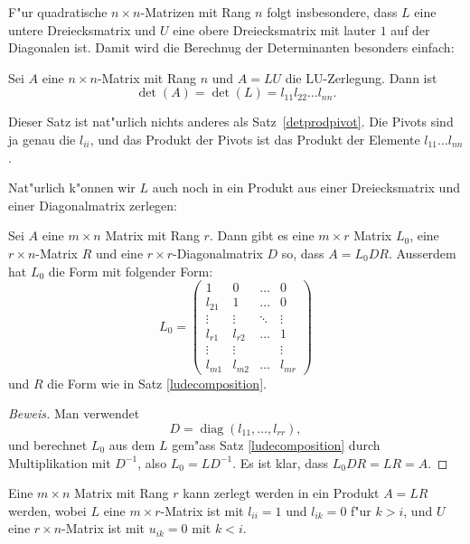F"ur quadratische $n\times n$-Matrizen mit Rang $n$ folgt insbesondere,
dass $L$ eine untere Dreiecksmatrix und $U$ eine obere Dreiecksmatrix
mit lauter $1$ auf der Diagonalen ist.
Damit wird die Berechnug der
Determinanten besonders einfach:

\begin{satz}
Sei $A$ eine $n\times n$-Matrix mit Rang $n$ und $A=LU$ die LU-Zerlegung.
Dann ist
\[
\det(A)=\det(L)=l_{11}l_{22}\dots l_{nn}.
\]
\end{satz}

Dieser Satz ist nat"urlich nichts anderes als Satz~\ref{detprodpivot}.
Die Pivots sind ja genau die $l_{ii}$, und 
das Produkt der Pivots ist das Produkt der Elemente
$l_{11}\dots l_{nn}$.

Nat"urlich k"onnen wir $L$ auch noch in ein Produkt aus einer
Dreiecksmatrix und einer Diagonalmatrix zerlegen:

\begin{satz}
\label{ldrdecomposition}
Sei $A$ eine $m\times n$ Matrix mit Rang $r$.
Dann gibt es eine $m\times r$ Matrix $L_0$, eine $r\times n$-Matrix $R$
und eine $r\times r$-Diagonalmatrix $D$
so, dass $A=L_0DR$.
Ausserdem hat $L_0$ die Form mit folgender Form:
\[
L_0=\begin{pmatrix}
1     &0&\dots&0\\
l_{21}&1     &\dots&0\\
\vdots&\vdots&\ddots&\vdots\\
l_{r1}&l_{r2}&\dots&1     \\
\vdots&\vdots& &\vdots\\
l_{m1}&l_{m2}&\dots&l_{mr}
\end{pmatrix}
\]
und $R$ die Form wie in Satz \ref{ludecomposition}.
\end{satz}

\begin{proof}[Beweis]
Man verwendet 
\[
D=\operatorname{diag}(l_{11},\dots,l_{rr}),
\]
und berechnet $L_0$ aus dem $L$ gem"ass Satz \ref{ludecomposition} durch
Multiplikation mit $D^{-1}$, also $L_0=LD^{-1}$.
Es ist klar, dass
$L_0DR=LR=A$.
\end{proof}

\begin{satz}[LR-Zerlegung]
Eine $m\times n$ Matrix mit Rang $r$ kann zerlegt werden in ein Produkt $A=LR$
werden, wobei $L$ eine $m\times r$-Matrix ist mit $l_{ii}=1$ und $l_{ik}=0$
f"ur $k>i$, und $U$ eine $r\times n$-Matrix ist mit $u_{ik}=0$ mit $k<i$.
\end{satz}


